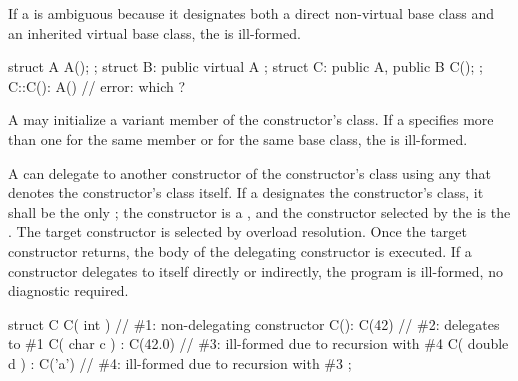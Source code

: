 \pnum
If a
is ambiguous because it designates both a direct non-virtual base class and
an inherited virtual base class, the
is ill-formed.
\begin{example}
\begin{codeblock}
struct A { A(); };
struct B: public virtual A { };
struct C: public A, public B { C(); };
C::C(): A() { }                 // error: which ?
\end{codeblock}
\end{example}

\pnum
A
may initialize a variant member of the
constructor's class.
If a
specifies more than one
for the same member or for the same base class,
the
is ill-formed.

\pnum
A  can delegate to another
constructor of the constructor's class using any
 that denotes the constructor's class itself. If a
 designates the constructor's class,
it shall be the only ; the constructor
is a , and the constructor selected by the
 is the .
The target constructor is selected by overload resolution.
Once the target constructor returns, the body of the delegating constructor
is executed. If a constructor delegates to itself directly or indirectly,
the program is ill-formed, no diagnostic required.
\begin{example}
\begin{codeblock}
struct C {
  C( int ) { }                  // \#1: non-delegating constructor
  C(): C(42) { }                // \#2: delegates to \#1
  C( char c ) : C(42.0) { }     // \#3: ill-formed due to recursion with \#4
  C( double d ) : C('a') { }    // \#4: ill-formed due to recursion with \#3
};
\end{codeblock}
\end{example}

